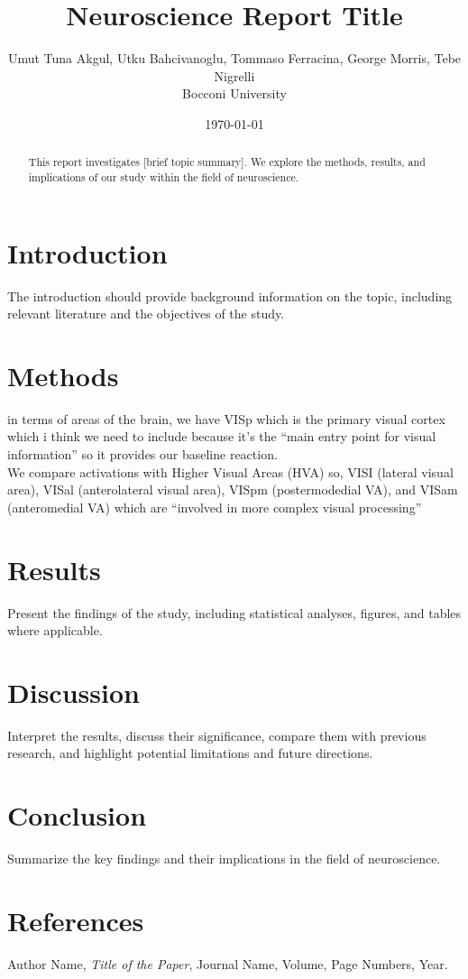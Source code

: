 \documentclass[a4paper,12pt]{article}
\begin{document}
\title{Neuroscience Report Title}
\author{
    Umut Tuna Akgul, 
    Utku Bahcivanoglu, 
    Tommaso Ferracina, 
    George Morris, 
    Tebe Nigrelli  \\  Bocconi University}
\date{\today}


\maketitle

\begin{abstract}
\noindent
This report investigates [brief topic summary]. We explore the methods, results, and implications of our study within the field of neuroscience. 
\end{abstract}

\section{Introduction}
The introduction should provide background information on the topic, including relevant literature and the objectives of the study. 

\section{Methods}

in terms of areas of the brain, we have VISp which is the primary visual cortex which i think we need to include because it’s the “main entry point for visual information” so it provides our baseline reaction. \\

We compare activations with Higher Visual Areas (HVA) so, VISI (lateral visual area), VISal (anterolateral visual area), VISpm (postermodedial VA), and VISam (anteromedial VA)
which are “involved in more complex visual processing”

\section{Results}
Present the findings of the study, including statistical analyses, figures, and tables where applicable.

\section{Discussion}
Interpret the results, discuss their significance, compare them with previous research, and highlight potential limitations and future directions.

\section{Conclusion}
Summarize the key findings and their implications in the field of neuroscience.

\section*{References}
\begin{thebibliography}{99}
 Author Name, \textit{Title of the Paper}, Journal Name, Volume, Page Numbers, Year.
\end{thebibliography}
\end{document}
